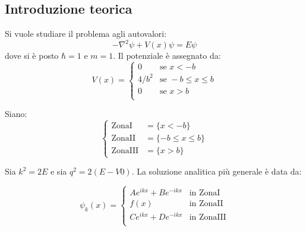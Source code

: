 \subsection*{Introduzione teorica}

Si vuole studiare il problema agli autovalori:
$$ -\nabla^2\psi + V(x)\psi = E \psi $$
dove si è posto $\hbar = 1$ e $m = 1$. Il potenziale è assegnato da:
$$ 
V(x)  = \begin{cases}
        0       & \mbox{se } x<-b \\
        4/b^2   & \mbox{se } -b \leq x \leq b \\
        0       & \mbox{se } x>b \\
         \end{cases}
$$

\bigskip
Siano:
$$ 
\begin{cases}
    \mbox{ZonaI} & = \{x<-b \} \\
    \mbox{ZonaII} & = \{-b \leq x \leq b\} \\
    \mbox{ZonaIII} & = \{x>b\}
\end{cases} $$

\bigskip
Sia $k^2 = 2E$ e sia $q^2 = 2(E-V0)$. La soluzione analitica più generale è data da:

$$
\psi_k(x) =
    \begin{cases}
        Ae^{ikx}+Be^{-ikx} & \mbox{in ZonaI} \\
        f(x) & \mbox{in ZonaII} \\
        Ce^{ikx}+De^{-ikx} & \mbox{in ZonaIII} \\
    \end{cases}
$$

